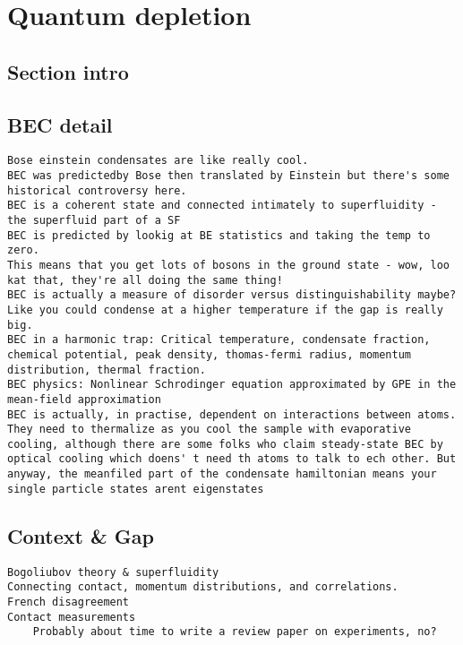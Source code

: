 \hypertarget{quantum-depletion}{%
\section{Quantum depletion}\label{quantum-depletion}}

\hypertarget{section-intro}{%
\subsection{Section intro}\label{section-intro}}

\hypertarget{bec-detail}{%
\subsection{BEC detail}\label{bec-detail}}

\begin{verbatim}
Bose einstein condensates are like really cool. 
BEC was predictedby Bose then translated by Einstein but there's some historical controversy here.
BEC is a coherent state and connected intimately to superfluidity - the superfluid part of a SF 
BEC is predicted by lookig at BE statistics and taking the temp to zero.
This means that you get lots of bosons in the ground state - wow, loo kat that, they're all doing the same thing!
BEC is actually a measure of disorder versus distinguishability maybe? Like you could condense at a higher temperature if the gap is really big.
BEC in a harmonic trap: Critical temperature, condensate fraction, chemical potential, peak density, thomas-fermi radius, momentum distribution, thermal fraction.
BEC physics: Nonlinear Schrodinger equation approximated by GPE in the mean-field approximation
BEC is actually, in practise, dependent on interactions between atoms. They need to thermalize as you cool the sample with evaporative cooling, although there are some folks who claim steady-state BEC by optical cooling which doens' t need th atoms to talk to ech other. But anyway, the meanfiled part of the condensate hamiltonian means your single particle states arent eigenstates
\end{verbatim}

\hypertarget{context-gap}{%
\subsection{Context \& Gap}\label{context-gap}}

\begin{verbatim}
Bogoliubov theory & superfluidity
Connecting contact, momentum distributions, and correlations.
French disagreement
Contact measurements
    Probably about time to write a review paper on experiments, no?
\end{verbatim}

